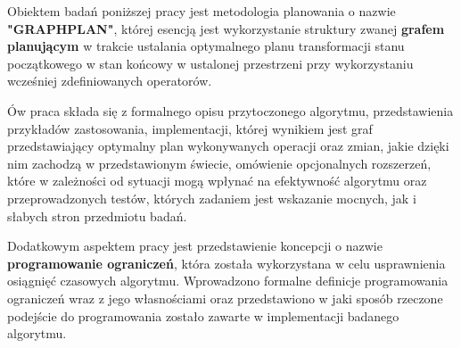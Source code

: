 \begin{streszczenie}
    Obiektem badań poniższej pracy jest metodologia planowania
    o nazwie \textbf{"GRAPHPLAN"}, której esencją jest wykorzystanie
    struktury zwanej \textbf{grafem planującym} w trakcie ustalania optymalnego planu transformacji
    stanu początkowego w stan końcowy w ustalonej przestrzeni przy wykorzystaniu wcześniej zdefiniowanych
    operatorów. 

    Ów praca składa się z formalnego opisu przytoczonego algorytmu, przedstawienia przykładów zastosowania,
    implementacji, której wynikiem jest graf przedstawiający optymalny plan wykonywanych operacji oraz zmian, jakie dzięki nim zachodzą w 
    przedstawionym świecie, omówienie opcjonalnych rozszerzeń, które w zależności od sytuacji mogą wpłynać na efektywność algorytmu
    oraz przeprowadzonych testów, których zadaniem jest wskazanie mocnych, jak i słabych stron przedmiotu badań. 

    Dodatkowym aspektem pracy jest przedstawienie koncepcji o nazwie \textbf{programowanie ograniczeń}, 
    która została wykorzystana w celu usprawnienia osiągnięć czasowych algorytmu. 
    Wprowadzono formalne definicje programowania ograniczeń wraz z jego własnościami oraz przedstawiono w jaki sposób rzeczone podejście do 
    programowania zostało zawarte w implementacji badanego algorytmu.

\end{streszczenie}
